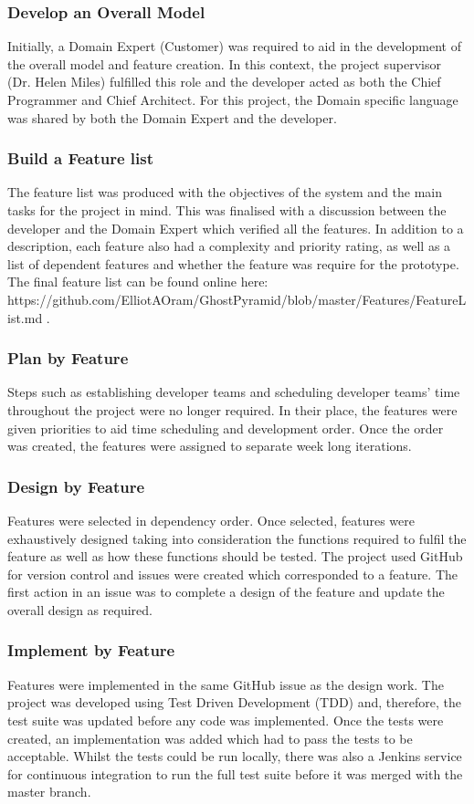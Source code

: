 \subsubsection{Develop an Overall Model}
Initially, a Domain Expert (Customer) was required to aid in the development of the overall model and feature creation. In this context, the project supervisor (Dr. Helen Miles) fulfilled this role and the developer acted as both the Chief Programmer and Chief Architect. For this project, the Domain specific language was shared by both the Domain Expert and the developer.

\subsubsection{Build a Feature list}
The feature list was produced with the objectives of the system and  the main tasks for the project in mind. This was finalised with a discussion between the developer and the Domain Expert which verified all the features. In addition to a description, each feature also had a complexity and priority rating, as well as a list of dependent features and whether the feature was require for the prototype. The final feature list can be found online here: \\ https://github.com/ElliotAOram/GhostPyramid/blob/master/Features/FeatureList.md .

\subsubsection{Plan by Feature}
Steps such as establishing developer teams and scheduling developer teams' time throughout the project were no longer required. In their place, the features were given priorities to aid time scheduling and development order. Once the order was created, the features were assigned to separate week long iterations.

\subsubsection{Design by Feature}
Features were selected in dependency order. Once selected, features were exhaustively designed taking into consideration the functions required to fulfil the feature as well as how these functions should be tested. The project used GitHub for version control and issues were created which corresponded to a feature. The first action in an issue was to complete a design of the feature and update the overall design as required.

\subsubsection{Implement by Feature}
Features were implemented in the same GitHub issue as the design work. The project was developed using Test Driven Development (TDD) and, therefore, the test suite was updated before any code was implemented. Once the tests were created, an implementation was added which had to pass the tests to be acceptable. Whilst the tests could be run locally, there was also a Jenkins service for continuous integration to run the full test suite before it was merged with the master branch.  
